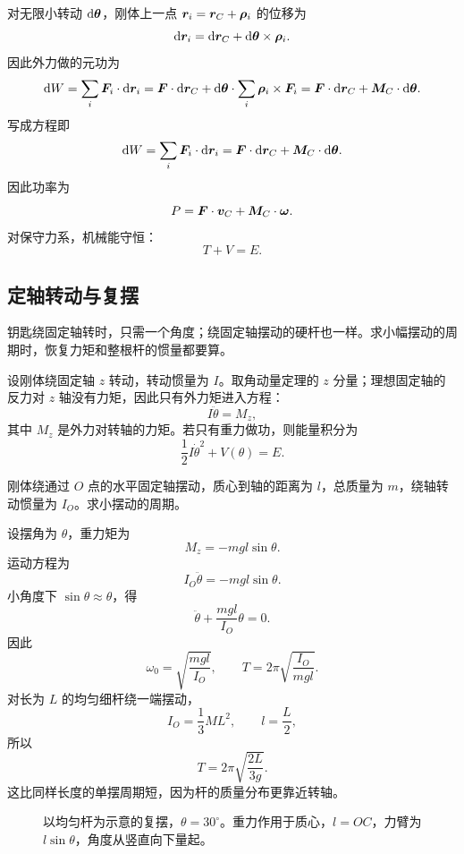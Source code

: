 对无限小转动 \(\mathrm{d}\boldsymbol{\theta}\)，刚体上一点 \(\boldsymbol{r}_i=\boldsymbol{r}_C+\boldsymbol\rho_i\) 的位移为
\[
\mathrm{d}\boldsymbol{r}_i=\mathrm{d}\boldsymbol{r}_C+\mathrm{d}\boldsymbol{\theta}\times\boldsymbol\rho_i.
\]
因此外力做的元功为
\[
\mathrm{d} W=\sum_i\boldsymbol{F}_i\cdot\mathrm{d}\boldsymbol{r}_i
=\boldsymbol{F}\cdot\mathrm{d}\boldsymbol{r}_C
+\mathrm{d}\boldsymbol{\theta}\cdot\sum_i\boldsymbol\rho_i\times\boldsymbol{F}_i
=\boldsymbol{F}\cdot\mathrm{d}\boldsymbol{r}_C+\boldsymbol{M}_C\cdot\mathrm{d}\boldsymbol{\theta}.
\]
写成方程即
\begin{equation}
\mathrm{d} W=\sum_i\boldsymbol{F}_i\cdot\mathrm{d}\boldsymbol{r}_i
=\boldsymbol{F}\cdot\mathrm{d}\boldsymbol{r}_C+\boldsymbol{M}_C\cdot\mathrm{d}\boldsymbol{\theta}.
\label{eq:rigid-work}
\end{equation}
因此功率为
\begin{equation}
P=\boldsymbol{F}\cdot\boldsymbol{v}_C+\boldsymbol{M}_C\cdot\boldsymbol{\omega}.
\label{eq:rigid-power}
\end{equation}
对保守力系，机械能守恒：
\[
T+V=E.
\]

\subsection{定轴转动与复摆}

钥匙绕固定轴转时，只需一个角度；绕固定轴摆动的硬杆也一样。求小幅摆动的周期时，恢复力矩和整根杆的惯量都要算。

设刚体绕固定轴 \(z\) 转动，转动惯量为 \(I\)。取角动量定理的 \(z\) 分量；理想固定轴的反力对 \(z\) 轴没有力矩，因此只有外力矩进入方程：
\begin{equation}
I\ddot\theta=M_z,
\label{eq:fixed-axis-equation}
\end{equation}
其中 \(M_z\) 是外力对转轴的力矩。若只有重力做功，则能量积分为
\[
\frac12I\dot\theta^2+V(\theta)=E.
\]

\begin{example}[复摆]
刚体绕通过 \(O\) 点的水平固定轴摆动，质心到轴的距离为 \(l\)，总质量为 \(m\)，绕轴转动惯量为 \(I_O\)。求小摆动的周期。

设摆角为 \(\theta\)，重力矩为
\[
M_z=-mgl\sin\theta.
\]
运动方程为
\[
I_O\ddot\theta=-mgl\sin\theta.
\]
小角度下 \(\sin\theta\approx\theta\)，得
\[
\ddot\theta+\frac{mgl}{I_O}\theta=0.
\]
因此
\[
\omega_0=\sqrt{\frac{mgl}{I_O}},
\qquad
T=2\pi\sqrt{\frac{I_O}{mgl}}.
\]
对长为 \(L\) 的均匀细杆绕一端摆动，
\[
I_O=\frac13ML^2,\qquad l=\frac L2,
\]
所以
\[
T=2\pi\sqrt{\frac{2L}{3g}}.
\]
这比同样长度的单摆周期短，因为杆的质量分布更靠近转轴。
\end{example}

\begin{figure}[htbp]
\centering
{}
\caption{以均匀杆为示意的复摆，$\theta=30^\circ$。重力作用于质心，$l=OC$，力臂为$l\sin\theta$，角度从竖直向下量起。}
\label{fig:physical-pendulum}
\end{figure}

